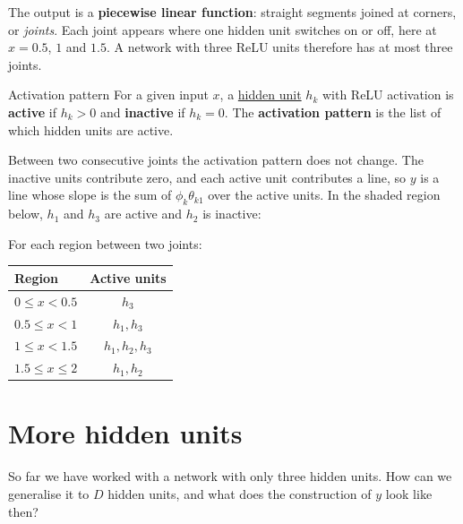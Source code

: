 \documentclass[a4paper,12pt,oneside]{report}
\begin{document}
The output is a \textbf{piecewise linear function}: straight segments
joined at corners, or \emph{joints}. Each joint appears where one
hidden unit switches on or off, here at $x=0.5$, $1$ and $1.5$. A
network with three ReLU units therefore has at most three joints.

\begin{frameddefn}{Activation pattern}\label{def:activation-pattern}
For a given input $x$, a
\hyperref[def:hidden-unit]{hidden unit} $h_k$ with ReLU activation is
\textbf{active} if $h_k>0$ and \textbf{inactive} if $h_k=0$.
The \textbf{activation pattern} is the list of which hidden units are
active.
\end{frameddefn}

Between two consecutive joints the activation pattern does not change.
The inactive units contribute zero, and each active unit contributes a
line, so $y$ is a line whose slope is the sum of $\phi_k\theta_{k1}$
over the active units. In the shaded region below, $h_1$ and $h_3$
are active and $h_2$ is inactive:
\begin{center}
\end{center}
For each region between two joints:
\begin{center}
\begin{tabular}{@{}lc@{}}
\toprule
Region & Active units\\
\midrule
$0\le x<0.5$   & $h_3$\\
$0.5\le x<1$   & $h_1,h_3$\\
$1\le x<1.5$   & $h_1,h_2,h_3$\\
$1.5\le x\le 2$ & $h_1,h_2$\\
\bottomrule
\end{tabular}
\end{center}

\clearpage
\section{More hidden units}

So far we have worked with a network with only three hidden units.
How can we generalise it to $D$ hidden units, and what does the
construction of $y$ look like then?
\end{document}

